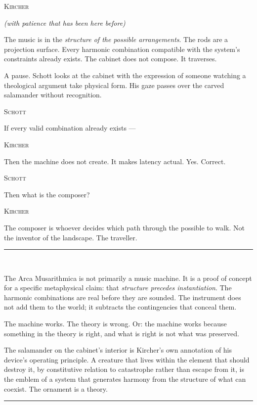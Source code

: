 \documentclass[12pt, a4paper, twoside]{memoir}
\theoremstyle{definition}
\theoremstyle{remark}
\newenvironment{action}{%
  \vspace{4pt}%
  \noindent\begin{minipage}{\linewidth}%
  \setlength{\parindent}{0pt}%
  \itshape\color{kircherink}%
}{%
  \end{minipage}\vspace{6pt}%
}
\newenvironment{dialogue}[1]{%
  \vspace{6pt}%
  \noindent\hspace{24mm}%
  \begin{minipage}{0.6\linewidth}%
  \begin{center}%
  {\small\textsc{#1}}%
  \end{center}%
  \vspace{2pt}%
}{%
  \end{minipage}\vspace{6pt}%
}
\newcommand{\paren}[1]{%
  \begin{center}%
  \small\itshape\color{plaguegrey}(#1)%
  \end{center}%
}
\newenvironment{interlude}{%
  \vspace{10pt}%
  \noindent\rule{\linewidth}{0.4pt}\\[2pt]%
  \noindent{\small\textsc{Theoretical Interlude}}\smallskip%
  \begin{mdframed}[
    linecolor=cosmosblue,
    linewidth=0.6pt,
    backgroundcolor=cosmosblue!4,
    innerleftmargin=10pt,
    innerrightmargin=10pt,
    innertopmargin=8pt,
    innerbottommargin=8pt,
    leftmargin=0pt,
    rightmargin=0pt,
  ]%
  \small
}{%
  \end{mdframed}%
  \vspace{6pt}%
  \noindent\rule{\linewidth}{0.4pt}\vspace{8pt}%
}
\begin{document}
\begin{dialogue}{Kircher}
\paren{with patience that has been here before}
The music is in the \textit{structure of the possible arrangements}. The rods are a projection surface. Every harmonic combination compatible with the system's constraints already exists. The cabinet does not compose. It traverses.
\end{dialogue}

\begin{action}
A pause. Schott looks at the cabinet with the expression of someone watching a theological argument take physical form. His gaze passes over the carved salamander without recognition.
\end{action}

\begin{dialogue}{Schott}
If every valid combination already exists ---
\end{dialogue}

\begin{dialogue}{Kircher}
Then the machine does not create. It makes latency actual. Yes. Correct.
\end{dialogue}

\begin{dialogue}{Schott}
Then what is the composer?
\end{dialogue}

\begin{dialogue}{Kircher}
The composer is whoever decides which path through the possible to walk. Not the inventor of the landscape. The traveller.
\end{dialogue}

\begin{interlude}
The Arca Musarithmica is not primarily a music machine. It is a proof of concept for a specific metaphysical claim: that \textit{structure precedes instantiation}. The harmonic combinations are real before they are sounded. The instrument does not add them to the world; it subtracts the contingencies that conceal them.

The machine works. The theory is wrong. Or: the machine works because something in the theory is right, and what is right is not what was preserved.

The salamander on the cabinet's interior is Kircher's own annotation of his device's operating principle. A creature that lives within the element that should destroy it, by constitutive relation to catastrophe rather than escape from it, is the emblem of a system that generates harmony from the structure of what can coexist. The ornament is a theory.
\end{interlude}
\end{document}
